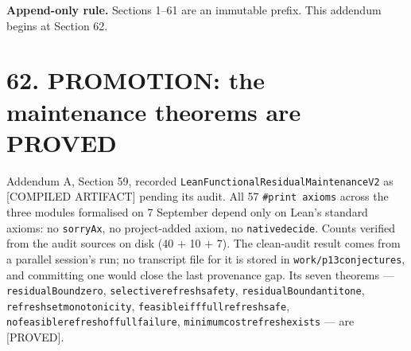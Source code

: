 \documentclass[9pt,twocolumn]{article}
\newcommand{\eclass}[1]{\textsf{[#1]}}
\renewcommand{\_}{\CIGunderscore\allowbreak}
\begin{document}
\sloppy
{}

\textbf{Append-only rule.} Sections 1--61 are an immutable prefix. This addendum begins at Section 62.

\section*{62. PROMOTION: the maintenance theorems are PROVED}
Addendum A, Section 59, recorded \texttt{LeanFunctionalResidualMaintenanceV2} as \eclass{COMPILED ARTIFACT} pending its audit. All 57 \texttt{\#print axioms} across the three modules formalised on 7 September depend only on Lean's standard axioms: no \texttt{sorryAx}, no project-added axiom, no \texttt{native\_decide}. Counts verified from the audit sources on disk (40 + 10 + 7). The clean-audit result comes from a parallel session's run; no transcript file for it is stored in \texttt{work/p13\_conjectures}, and committing one would close the last provenance gap. Its seven theorems --- \texttt{residualBound\_zero}, \texttt{selective\_refresh\_safety}, \texttt{residualBound\_antitone}, \texttt{refresh\_set\_monotonicity}, \texttt{feasible\_iff\_full\_refresh\_safe}, \texttt{no\_feasible\_refresh\_of\_full\_failure}, \texttt{minimum\_cost\_refresh\_exists} --- are \eclass{PROVED}.
\end{document}
